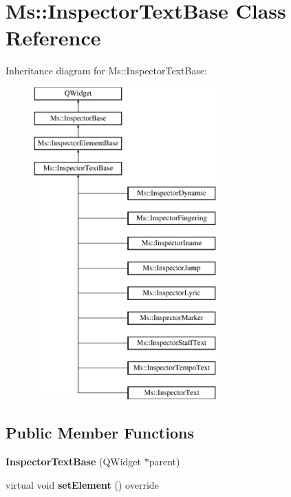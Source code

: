 \hypertarget{class_ms_1_1_inspector_text_base}{}\section{Ms\+:\+:Inspector\+Text\+Base Class Reference}
\label{class_ms_1_1_inspector_text_base}
Inheritance diagram for Ms\+:\+:Inspector\+Text\+Base\+:\begin{figure}[H]
\begin{center}
\leavevmode
\includegraphics[height=12.000000cm]{class_ms_1_1_inspector_text_base}
\end{center}
\end{figure}
\subsection*{Public Member Functions}
\begin{DoxyCompactItemize}
\item 
\mbox{\label{class_ms_1_1_inspector_text_base_ab345de4443fa114da479e6d2d36c37f1}} 
{\bfseries Inspector\+Text\+Base} (Q\+Widget $\ast$parent)
\item 
\mbox{\label{class_ms_1_1_inspector_text_base_ae9305d5456647cc72ac7e705091513da}} 
virtual void {\bfseries set\+Element} () override
\end{DoxyCompactItemize}
